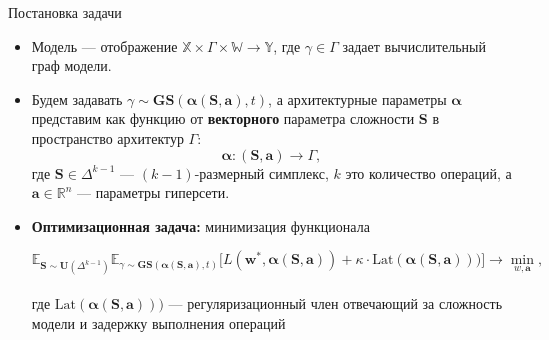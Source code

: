 \documentclass{beamer}
\begin{document}
\begin{frame}{Постановка задачи} %
\begin{itemize}
    \item Модель --- отображение $\mathbb{X} \times \Gamma \times \mathbb{W} \to \mathbb{Y}$, где $\gamma \in \Gamma$ задает вычислительный граф модели. 
    \item Будем задавать $\gamma \sim \textbf{GS}(\boldsymbol{\alpha}(\boldsymbol{S}, \boldsymbol{a}), t)$, а  архитектурные параметры \(\boldsymbol{\alpha}\) представим как функцию от \textbf{векторного} параметра сложности $ \boldsymbol{S}$ в пространство архитектур \(  \Gamma \):
    \[
    \boldsymbol{\alpha}: (\boldsymbol{S},\boldsymbol{a}) \to \Gamma, 
    \]
    где $ \boldsymbol{S} \in \Delta^{k-1}$ ---  \((k-1)\)-размерный симплекс,  \(k\) это количество операций, а \(\boldsymbol{a} \in \mathbb{R}^n\) --- параметры гиперсети. 
     
    
    \item \textbf{Оптимизационная задача:} минимизация функционала
    \begin{adjustwidth}{-1cm}{0cm} 
    $$\mathbb{E}_{\boldsymbol{S}\sim \boldsymbol{U}(\Delta^{k-1}) } \mathbb{E}_{\gamma\sim \textbf{GS} (\boldsymbol{\alpha}(\boldsymbol{S}, \boldsymbol{a}),t) }  \big[L(\boldsymbol{w}^*, \boldsymbol{\alpha}(\boldsymbol{S},\boldsymbol{a})) + \kappa \cdot \text{Lat}(\boldsymbol{\alpha}(\boldsymbol{S},\boldsymbol{a})))\big] \to \min\limits_{w,\boldsymbol{a}},
    $$\\
    где $\text{Lat}(\boldsymbol{\alpha}(\boldsymbol{S}, \boldsymbol{a})))$ --- регуляризационный член отвечающий за сложность модели и задержку выполнения операций
    \end{adjustwidth}
\end{itemize}


    
\end{frame}
\end{document}
